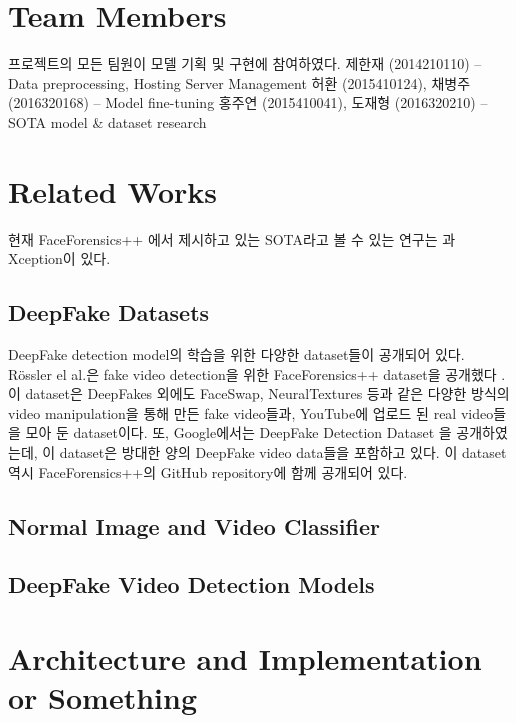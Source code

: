 \documentclass{article}
\begin{document}
	\section{Team Members}
	프로젝트의 모든 팀원이 모델 기획 및 구현에 참여하였다. \newline 
	제한재 (2014210110) -- Data preprocessing, Hosting Server Management\newline
	허환 (2015410124), 채병주 (2016320168) -- Model fine-tuning\newline
	홍주연 (2015410041), 도재형 (2016320210) -- SOTA model \& dataset research 
	\section{Related Works}
	
	현재 FaceForensics++ 에서 제시하고 있는 SOTA라고 볼 수 있는 연구는 \cite{darius2018MesoNet}과 Xception이 있다.
	
		\subsection{DeepFake Datasets}
		DeepFake detection model의 학습을 위한 다양한 dataset들이 공개되어 있다. R\"ossler el al.은 fake video detection을 위한 FaceForensics++ dataset을 공개했다 \cite{roessler2019faceforensicspp}. 이 dataset은 DeepFakes 외에도 FaceSwap, NeuralTextures 등과 같은 다양한 방식의 video manipulation을 통해 만든 fake video들과, YouTube에 업로드 된 real video들을 모아 둔 dataset이다. 또, Google에서는 DeepFake Detection Dataset \cite{DDD_GoogleJigSaw2019} 을 공개하였는데, 이 dataset은 방대한 양의 DeepFake video data들을 포함하고 있다. 이 dataset 역시 FaceForensics++의 GitHub 
		repository에 함께 공개되어 있다.
		
		\subsection{Normal Image and Video Classifier}
		
		\subsection{DeepFake Video Detection Models}
	
	\section{Architecture and Implementation or Something}
	
\end{document}
